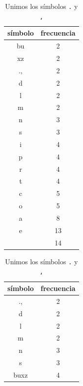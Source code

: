 \documentclass[letterpaper,11pt]{article}
\begin{document}
\begin{enumerate}
    \begin{table}[H]
        \parbox{.45\linewidth}{
        \centering
        \begin{tabular}{|c|c|}
            \hline
            símbolo & frecuencia \\
            \hline
            bu & 2 \\
            \hline
            xz & 2 \\
            \hline
            ., & 2 \\
            \hline
            d & 2 \\
            \hline
            l & 2 \\
            \hline
            m & 2 \\
            \hline
            n & 3 \\
            \hline
            s & 3 \\
            \hline
            i & 4 \\
            \hline
            p & 4 \\
            \hline
            r & 4 \\
            \hline
            t & 4 \\
            \hline
            c & 5 \\
            \hline
            o & 5 \\
            \hline
            a & 8 \\
            \hline
            e & 13 \\
            \hline
            \texttt{\char32} & 14 \\
            \hline
        \end{tabular}
        \caption{Unimos los símbolos \texttt{.} y \texttt{,}}
        }
        \hfill
        \parbox{.45\linewidth}{
        \centering
        \begin{tabular}{|c|c|}
            \hline
            símbolo & frecuencia \\
            \hline
            ., & 2 \\
            \hline
            d & 2 \\
            \hline
            l & 2 \\
            \hline
            m & 2 \\
            \hline
            n & 3 \\
            \hline
            s & 3 \\
            \hline
            buxz & 4 \\

\end{tabular}}
\end{table}
\end{enumerate}
\end{document}

